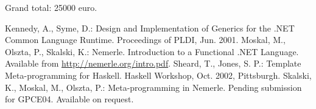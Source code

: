\documentclass[a4paper,11pt]{article}
\begin{document}
Grand total: 25000 euro.



\begin{thebibliography}{22}
Kennedy, A., Syme, D.:
Design and Implementation of Generics for the .NET Common Language Runtime.
Proceedings of PLDI, Jun. 2001.
Moskal, M., Olszta, P., Skalski, K.:
Nemerle. Introduction to a Functional .NET Language.
Available from \url{http://nemerle.org/intro.pdf}.
Sheard, T., Jones, S. P.:
Template Meta-programming for Haskell.
Haskell Workshop, Oct. 2002, Pittsburgh.
Skalski, K., Moskal, M., Olszta, P.:
Meta-programming in Nemerle.
Pending submission for GPCE04. Available on request.
\end{thebibliography}
\end{document}
